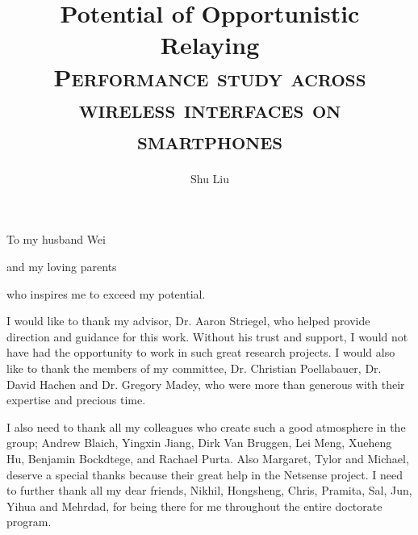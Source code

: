\documentclass[textrefs,review]{nddiss2e}
\begin{document}
\frontmatter

\title{Potential of Opportunistic Relaying\\ {\small\scshape Performance study across wireless interfaces on smartphones} }
\author{Shu Liu}

\maketitle
%
%

\makecopyright

\begin{abstract}
\end{abstract}

\renewcommand{\dedicationname}{}

\begin{dedication}
  To my husband Wei
  
  and my loving parents
  
  who inspires me to exceed my potential.
   
\end{dedication}

\tableofcontents
\listoffigures
\listoftables

\begin{acknowledge}
I would like to thank my advisor, Dr. Aaron Striegel, who helped provide
direction and guidance for this work. Without his trust and support, I would not have had the opportunity to work in such great research projects. I would also like to thank the members of my committee, Dr. Christian Poellabauer, Dr. David Hachen and Dr. Gregory Madey, who were more than generous with their expertise and precious time.

I also need to thank all my colleagues who create such a good atmosphere in the group;
Andrew Blaich, Yingxin Jiang, Dirk Van Bruggen, Lei Meng, Xueheng Hu, Benjamin Bockdtege, and Rachael Purta.  Also Margaret, Tylor and Michael, deserve a special thanks because their great help in the Netsense project. I need to further thank all my dear friends, Nikhil, Hongsheng, Chris, Pramita, Sal, Jun, Yihua and Mehrdad, for being there for me throughout the entire doctorate program. 
\end{acknowledge}
\end{document}
